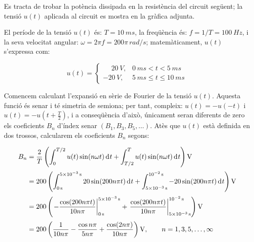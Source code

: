 \begin{exemple}\label{ex:CircuitFourier}
	\addcontentsxms{\CircuitFourier}
     Es tracta de trobar la potència
     dissipada en la resistència del circuit següent; la tensió $u(t)$ aplicada al circuit     es mostra en la gràfica adjunta.

    \begin{center}
        
    \end{center}

     El període de la tensió $u(t)$ és: $T=\qty{10}{ms}$, la freqüència és: $f=1/T=\qty{100}{Hz}$, i la
    seva velocitat angular: $\omega = 2\pi f = 200\pi\unit{\,rad/s}$;
    matemàticament, $u(t)$ s'expressa com:

    \[
    u(t) = \begin{cases} \phantom{-}\qty{20}{V}, & \qty{0}{ms} < t < \qty{5}{ms} \\
           \qty{-20}{V}, & \qty{5}{ms} \leq t \leq \qty{10}{ms} \end{cases}
    \]

    Comencem calculant l'expansió en sèrie de Fourier de la tensió
    $u(t)$. Aquesta funció és senar i té simetria de semiona; per tant,
     compleix: $u(t)=-u(-t)$ i $u(t) = -u(t+\frac{T}{2})$, i a conseqüència   d'això, únicament seran diferents de zero els coeficients $B_n$ d'índex senar $(B_1,B_3,B_5,\ldots)$. Atès que
    $u(t)$ està definida en dos trossos, calcularem els coeficients
    $B_n$ segons:

    \[
    \begin{split}
        B_n &= \frac{2}{T} \left( \int_0^{T/2} u(t) \sin(n \omega t) \diff t+
        \int_{T/2}^{T} u(t) \sin(n \omega t) \diff t\right) \unit{V} \\[0.5ex]
        &= 200 \left( \int_{\qty{0}{s}}^{\qty{5e-3}{s}} 20 \sin(200 n \pi t) \diff t+
        \int_{\qty{5e-3}{s}}^{\qty{e-2}{s}} -20 \sin(200 n \pi t) \diff t \right) \unit{V}\\[0.5ex]
        &= 200 \left( \left. -\frac{\cos(200 n \pi t)}{10 n \pi}\right|_{\qty{0}{s}}^{\qty{5e-3}{s}}
        +  \left.\frac{\cos(200 n \pi t)}{10 n \pi}\right|_{\qty{5e-3}{s}}^{\qty{e-2}{s}}\right) \unit{V}\\[0.5ex]
        &= 200\left( \frac{1}{10 n \pi} - \frac{\cos n \pi}{5 n \pi} +
        \frac{\cos (2 n \pi)}{10 n \pi}\right) \unit{V},
        \qquad n=1,3,5,\ldots,\infty
    \end{split}
    \]


\end{exemple}
